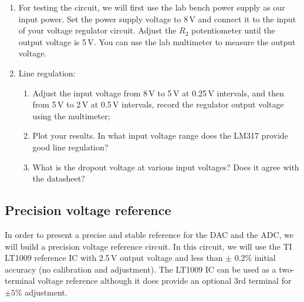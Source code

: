 \documentclass[letterpaper, 11pt]{article}
\begin{document}
\begin{enumerate}
\item For testing the circuit, we will first use the lab bench power supply as our input power. Set the power supply voltage to 8\,V and connect it to the input of your voltage regulator circuit. Adjust the $R_2$ potentiometer until the output voltage is 5\,V. You can use the lab multimeter to measure the output voltage. 

\item Line regulation: 
	\begin{enumerate}
		\item Adjust the input voltage from 8\,V to 5\,V at 0.25\,V intervals, and then from 5\,V to 2\,V at 0.5\,V intervals, record the regulator output voltage using the multimeter; 
		\item Plot your results. In what input voltage range does the LM317 provide good line regulation? 
		\item What is the dropout voltage at various input voltages? Does it agree with the datasheet?
	\end{enumerate}
	

\end{enumerate}


\subsection{Precision voltage reference}
\label{sec:lt1009}

In order to present a precise and stable reference for the DAC and the ADC, we will build a precision voltage reference circuit. In this circuit, we will use the TI LT1009 reference IC with 2.5\,V output voltage and less than $\pm$ 0.2\% initial accuracy (no calibration and adjustment). The LT1009 IC can be used as a two-terminal voltage reference although it does provide an optional 3rd terminal for $\pm 5$\% adjustment.
\end{document}
